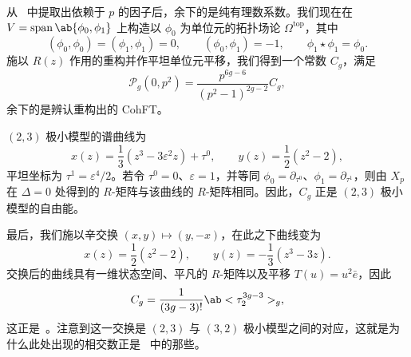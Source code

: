 \documentclass{amsart}
\theoremstyle{definition}
\theoremstyle{remark}
\theoremstyle{plain}
\theoremstyle{definition}
\theoremstyle{remark}
\newcommand{\ep}{\varepsilon}
\newcommand{\mc}[1]{\mathcal{#1}}
\newcommand{\mr}[1]{\mathrm{#1}}
\newcommand{\on}[1]{\operatorname{#1}}
\newcommand{\1}{\mathbf{1}}
\newcommand{\2}{\mathbf{2}}
\newcommand{\3}{\mathbf{3}}
\begin{document}
从~ 中提取出依赖于 \(p\) 的因子后，余下的是纯有理数系数。我们现在在 \(V = \on{span}\ab\{\phi_0,\phi_1\}\) 上构造以 \(\phi_0\) 为单位元的拓扑场论 \(\Omega^{\mr{top}}\)，其中
\[ (\phi_0,\phi_0) = (\phi_1,\phi_1) = 0, \qquad (\phi_0,\phi_1) = -1, \qquad \phi_1 \star \phi_1 = \phi_0. \]
施以 \(R(z)\) 作用的重构并作平坦单位元平移，我们得到一个常数 \(C_g\)，满足
\[ \mc{P}_g(0,p^2) = \frac{p^{6g-6}}{(p^2-1)^{2g-2}}C_g, \]
余下的是辨认重构出的 CohFT。

\((2,3)\) 极小模型的谱曲线为
\[ x(z) = \frac{1}{3}(z^3-3\ep^2 z) + \tau^0, \qquad y(z) = \frac{1}{2}(z^2-2), \]
平坦坐标为 \(\tau^1 = \ep^4/2\)。若令 \(\tau^0 = 0\)、\(\ep = 1\)，并等同 \(\phi_0 = \partial_{\tau^0}\)、\(\phi_1 = \partial_{\tau^1}\)，则由 \(X_p\) 在 \(\Delta = 0\) 处得到的 \(R\)-矩阵与该曲线的 \(R\)-矩阵相同。因此，\(C_g\) 正是 \((2,3)\) 极小模型的自由能。

最后，我们施以辛交换 \((x,y) \mapsto (y,-x)\)，在此之下曲线变为
\[ x(z) = \frac{1}{2}(z^2-2), \qquad y(z) = -\frac{1}{3}(z^3-3z). \]
交换后的曲线具有一维状态空间、平凡的 \(R\)-矩阵以及平移 \(T(u) = u^2 \bar{e}\)，因此
\[ C_g = \frac{1}{(3g-3)!}\ab<\tau_2^{3g-3}>_g, \]
这正是~。注意到这一交换是 \((2,3)\) 与 \((3,2)\) 极小模型之间的对应，这就是为什么此处出现的相交数正是~ 中的那些。

\printbibliography[title=参考文献]
\end{document}
